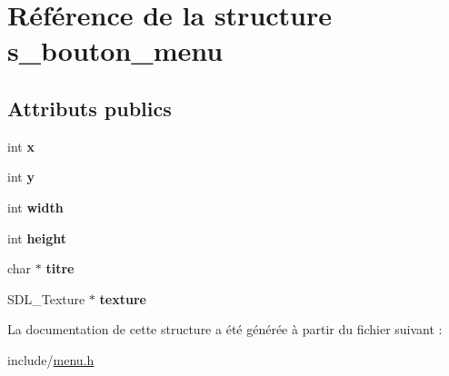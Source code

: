 \hypertarget{structs__bouton__menu}{}\section{Référence de la structure s\+\_\+bouton\+\_\+menu}
\label{structs__bouton__menu}
\subsection*{Attributs publics}
\begin{DoxyCompactItemize}
\item 
\mbox{\label{structs__bouton__menu_a9c3f6f6be6b0158a9a8c4a1c20665db6}} 
int {\bfseries x}
\item 
\mbox{\label{structs__bouton__menu_ada7d8855acb0aed9f19b7391aec1d7f8}} 
int {\bfseries y}
\item 
\mbox{\label{structs__bouton__menu_a759777359e5e76e39505d2d49d405906}} 
int {\bfseries width}
\item 
\mbox{\label{structs__bouton__menu_a0cd163542f7a5bb70582dab50a787ae9}} 
int {\bfseries height}
\item 
\mbox{\label{structs__bouton__menu_a6c37187d85823c83a30508ddf1605619}} 
char $\ast$ {\bfseries titre}
\item 
\mbox{\label{structs__bouton__menu_aa09da24eeebcc74f770d72b74a0292f5}} 
S\+D\+L\+\_\+\+Texture $\ast$ {\bfseries texture}
\end{DoxyCompactItemize}


La documentation de cette structure a été générée à partir du fichier suivant \+:\begin{DoxyCompactItemize}
\item 
include/\hyperlink{menu_8h}{menu.\+h}\end{DoxyCompactItemize}

